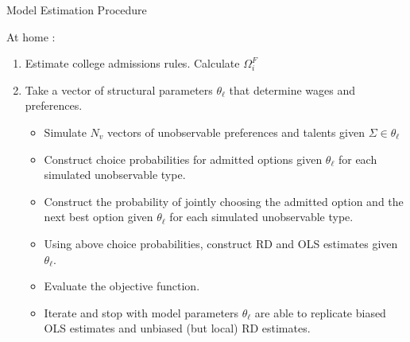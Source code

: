 \documentclass[table,10pt]{beamer}
\begin{document}
\begin{frame}{Model Estimation Procedure}

 At home :
\begin{enumerate}
  \item<2> Estimate college admissions rules. Calculate $\Omega_{i}^F$
  \medskip

  \item<3> Take a vector of structural parameters $\theta_{\ell}$ that determine wages and preferences.
  \medskip

  \begin{itemize}
    \item<4> Simulate $N_v$ vectors of unobservable preferences and talents given $\Sigma \in \theta_{\ell}$ \smallskip

    \item<5> Construct choice probabilities for admitted options given $\theta_{\ell}$ for each simulated unobservable type.
  \smallskip


    \item<7> Construct the probability of jointly choosing the admitted option and the next best option given $\theta_{\ell}$ for each simulated unobservable type.
  \smallskip

    \item<8> Using above choice probabilities, construct RD and OLS estimates given $\theta_{\ell}$.

    \item<9> Evaluate the objective function.


    \item<10> Iterate and stop with model parameters $\theta_{\ell}$ are able to replicate biased OLS estimates and unbiased (but local) RD estimates.

  \end{itemize}

\end{enumerate}

\end{frame}
\end{document}
